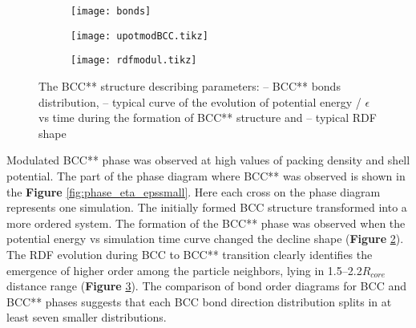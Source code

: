 \begin{figure}
\centering
\begin{subfigure}{.61\textwidth}
  \centering
  \texttt{[image: bonds]}
  \caption{}
  \label{fig:bondsmod} 
\end{subfigure}
\begin{subfigure}{.4\textwidth}
  \centering
 \texttt{[image: upotmodBCC.tikz]}
\caption{}
\label{fig:epot_modBCC} 
\end{subfigure}
\begin{subfigure}{.4\textwidth}
  \texttt{[image: rdfmodul.tikz]}
\caption{}%
\label{fig:rdfmodul}
\end{subfigure}
\caption{The BCC** structure describing parameters:  -- BCC** bonds distribution,  -- typical curve of the evolution of potential energy / $\epsilon$ vs time during the formation of BCC** structure and  -- typical RDF shape}
\label{fig:modulaphase}
\end{figure}


Modulated BCC** phase was observed at high values of packing density and shell potential.%
The part of the phase diagram where BCC** was observed is shown in the \textbf{Figure} \ref{fig:phase_eta_epssmall}. Here each cross on the phase diagram represents one simulation. The initially formed BCC structure transformed into a more ordered system. The formation of the BCC** phase was observed when the potential energy vs simulation time curve changed the decline shape (\textbf{Figure} \ref{fig:epot_modBCC}). The RDF evolution during BCC to BCC** transition clearly identifies the emergence of higher order among the particle neighbors, lying in 1.5--2.2$R_{core}$ distance range (\textbf{Figure} \ref{fig:rdfmodul}). 
The comparison of bond order diagrams for BCC and BCC** phases suggests that
each BCC bond direction distribution splits in at least seven smaller distributions.



